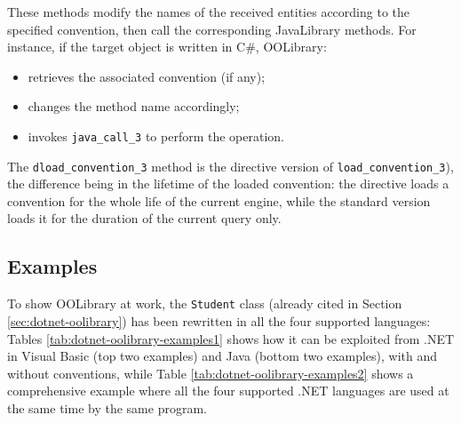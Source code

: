 \noindent These methods modify the names of the received entities according to the specified convention, then call the corresponding JavaLibrary methods.
For instance, if the target object is written in C\#, OOLibrary:
\begin{itemize}
  \item retrieves the associated convention (if any);
  \item changes the method name accordingly;
  \item invokes \texttt{java\_call\_3} to perform the operation.
\end{itemize}

\noindent The \texttt{dload\_convention\_3} method is the directive version of \texttt{load\_convention\_3}), the difference being in the lifetime of the loaded convention: the directive loads a convention for the whole life of the current \tuprolog{} engine, while the standard version loads it for the duration of the current query only.

\subsection{Examples}
\label{sec:dotnet-oolibrary-examples}

To show OOLibrary at work, the \texttt{Student} class (already cited in Section \ref{sec:dotnet-oolibrary}) has been rewritten in all the four supported languages:
Tables \ref{tab:dotnet-oolibrary-examples1} shows how it can be exploited from \tuprolog{}.NET in Visual Basic (top two examples) and Java (bottom two examples), with and without conventions, while Table \ref{tab:dotnet-oolibrary-examples2} shows a comprehensive example where all the four supported .NET languages are used at the same time by the same \tuprolog{} program.

